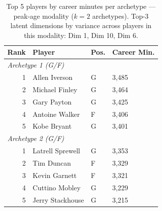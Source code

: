 \begin{table}[htbp]
  \centering\small
  \begin{tabular}{rlll}
    \toprule
    Rank & Player & Pos. & Career Min. \\
    \midrule
    \multicolumn{4}{l}{\textit{Archetype 1 (G/F)}} \\
    \midrule
    1 & Allen Iverson & G & 3,485 \\
    2 & Michael Finley & G & 3,464 \\
    3 & Gary Payton & G & 3,425 \\
    4 & Antoine Walker & F & 3,406 \\
    5 & Kobe Bryant & G & 3,401 \\
    \midrule[0.4pt]
    \multicolumn{4}{l}{\textit{Archetype 2 (G/F)}} \\
    \midrule
    1 & Latrell Sprewell & G & 3,353 \\
    2 & Tim Duncan & F & 3,329 \\
    3 & Kevin Garnett & F & 3,321 \\
    4 & Cuttino Mobley & G & 3,229 \\
    5 & Jerry Stackhouse & G & 3,215 \\
    \bottomrule
  \end{tabular}
  \caption{Top 5 players by career minutes per archetype --- peak-age modality ($k=2$ archetypes). Top-3 latent dimensions by variance across players in this modality: Dim 1, Dim 10, Dim 6.}
  \label{tab:arch_reps_peak_age}
\end{table}

